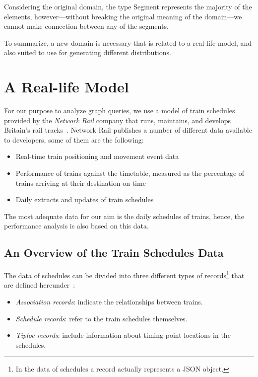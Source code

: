 Considering the original domain, the type \textsf{Segment} represents the majority of the elements, however---without breaking the original meaning of the domain---we cannot make connection between any of the segments.

To summarize, a new domain is necessary that is related to a real-life model, and also suited to use for generating different distributions.

\section{A Real-life Model}

For our purpose to analyze graph queries, we use a model of train schedules provided by the \textit{Network Rail} company that runs, maintains, and develops Britain's rail tracks~\cite{network_rail}. Network Rail publishes a number of different data available to developers, some of them are the following:
\begin{itemize}
	\item{Real-time train positioning and movement event data}
	\item{Performance of trains against the timetable, measured as the percentage of trains arriving at their destination on-time}
	\item{Daily extracts and updates of train schedules}
\end{itemize}

The most adequate data for our aim is the daily schedules of trains, hence, the performance analysis is also based on this data.

\subsection{An Overview of the Train Schedules Data}\label{sec:schedules_overview}
The data of schedules can be divided into three different types of records\footnote{In the data of schedules a record actually represents a JSON object.} that are defined hereunder~\cite{schedules_data}:
\begin{itemize}
	\item{\textit{Association records}}: indicate the relationships between trains.
	\item{\textit{Schedule records}}: refer to the train schedules themselves.
	\item{\textit{Tiploc records}}: include information about timing point locations in the schedules.
\end{itemize}

